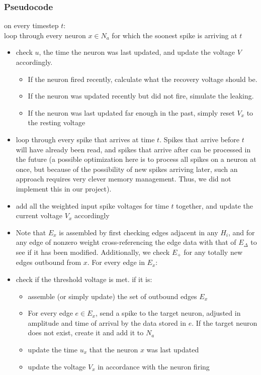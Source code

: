 \documentclass{article}
\begin{document}
\subsubsection{Pseudocode}
on every timestep $t$:
\vspace{5mm} \\
loop through every neuron $x \in N_a$ for which the soonest spike is arriving at $t$
\begin{itemize}
    \item check $u$, the time the neuron was last updated, and update the voltage $V$ accordingly. 
    \begin{itemize}
        \item If the neuron fired recently, calculate what the recovery voltage should be. 
        \item If the neuron was updated recently but did not fire, simulate the leaking. 
        \item If the neuron was last updated far enough in the past, simply reset $V_x$ to the resting voltage
    \end{itemize} 
    \item loop through every spike that arrives at time $t$. Spikes that arrive before $t$ will have already been read, and spikes that arrive after can be processed in the future (a possible optimization here is to process all spikes on a neuron at once, but because of the possibility of new spikes arriving later, such an approach requires very clever memory management. Thus, we did not implement this in our project).
    \item add all the weighted input spike voltages for time $t$ together, and update the current voltage $V_x$ accordingly
    \item Note that $E_x$ is assembled by first checking edges adjacent in any $H_i$, and for any edge of nonzero weight cross-referencing the edge data with that of $E_\Delta$ to see if it has been modified. Additionally, we check $E_+$ for any totally new edges outbound from $x$. For every edge in $E_x$:
    \item check if the threshold voltage is met. if it is:
    \begin{itemize}
        \item assemble (or simply update) the set of outbound edges $E_x$
        \item For every edge $e \in E_x$, send a spike to the target neuron, adjusted in amplitude and time of arrival by the data stored in $e$. If the target neuron does not exist, create it and add it to $N_a$
        \item update the time $u_x$ that the neuron $x$ was last updated
        \item update the voltage $V_x$ in accordance with the neuron firing
    \end{itemize}
\end{itemize}
\end{document}
